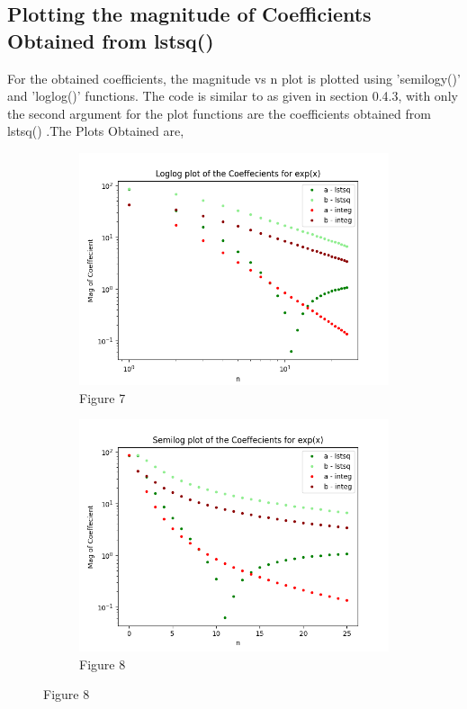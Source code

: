 \documentclass[12pt, a4paper]{report}
\begin{document}
\subsection{Plotting the magnitude of Coefficients Obtained from lstsq()}
For the obtained coefficients, the magnitude vs n plot is plotted using {\selectfont
'semilogy()'
} and {\selectfont
'loglog()'
} functions. The code is similar to as given in section 0.4.3, with only the second argument for the plot functions are the coefficients  obtained from {\selectfont
lstsq()
}.The Plots Obtained are,
 \begin{figure}[h!]

\begin{subfigure}{0.55\textwidth}
    \centering
    \includegraphics[scale=0.9,width=\linewidth]{fig7.png} 
    \caption{Figure 7}
    \label{fig:my_label}
\end{subfigure}
\begin{subfigure}{0.55\textwidth}
    \centering
    \includegraphics[scale=0.9,width=\linewidth]{fig8.png} 
    \caption{Figure 8}
    \label{fig:image2}
\end{subfigure}


\end{figure}
\end{document}

